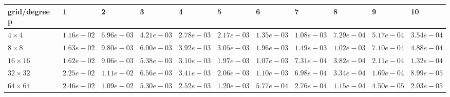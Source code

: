 \begin{tabular}{lllllllllll}
\hline
 grid/degree p   & 1          & 2          & 3          & 4          & 5          & 6          & 7          & 8          & 9          & 10         \\
\hline
 $4 \times 4$    & $1.16e-02$ & $6.96e-03$ & $4.21e-03$ & $2.78e-03$ & $2.17e-03$ & $1.35e-03$ & $1.08e-03$ & $7.29e-04$ & $5.17e-04$ & $3.54e-04$ \\
 $8 \times 8$    & $1.63e-02$ & $9.80e-03$ & $6.00e-03$ & $3.92e-03$ & $3.05e-03$ & $1.96e-03$ & $1.49e-03$ & $1.02e-03$ & $7.10e-04$ & $4.88e-04$ \\
 $16 \times 16$  & $1.62e-02$ & $9.06e-03$ & $5.38e-03$ & $3.10e-03$ & $1.97e-03$ & $1.07e-03$ & $7.31e-04$ & $3.82e-04$ & $2.11e-04$ & $1.32e-04$ \\
 $32 \times 32$  & $2.25e-02$ & $1.11e-02$ & $6.56e-03$ & $3.41e-03$ & $2.06e-03$ & $1.10e-03$ & $6.98e-04$ & $3.34e-04$ & $1.69e-04$ & $8.99e-05$ \\
 $64 \times 64$  & $2.46e-02$ & $1.09e-02$ & $5.30e-03$ & $2.52e-03$ & $1.20e-03$ & $5.77e-04$ & $2.76e-04$ & $1.15e-04$ & $4.50e-05$ & $2.03e-05$ \\
\hline
\end{tabular}